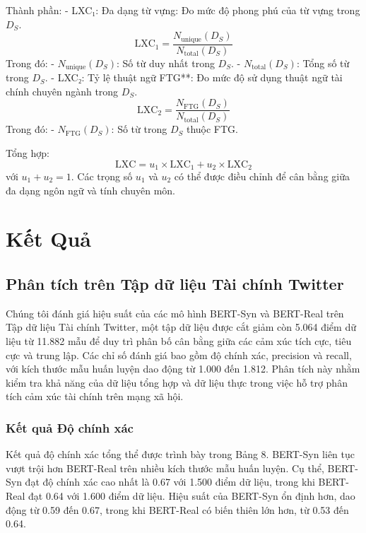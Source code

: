 \documentclass[a4paper,10pt]{article}
\begin{document}
Thành phần:
- LXC₁: Đa dạng từ vựng: Đo mức độ phong phú của từ vựng trong \( D_S \).
  \[
  \text{LXC}_1 = \frac{N_{\text{unique}}(D_S)}{N_{\text{total}}(D_S)}
  \]
  Trong đó:
  - \( N_{\text{unique}}(D_S) \): Số từ duy nhất trong \( D_S \).
  - \( N_{\text{total}}(D_S) \): Tổng số từ trong \( D_S \).
- LXC₂: Tỷ lệ thuật ngữ FTG**: Đo mức độ sử dụng thuật ngữ tài chính chuyên ngành trong \( D_S \).
  \[
  \text{LXC}_2 = \frac{N_{\text{FTG}}(D_S)}{N_{\text{total}}(D_S)}
  \]
  Trong đó:
  - \( N_{\text{FTG}}(D_S) \): Số từ trong \( D_S \) thuộc FTG.

Tổng hợp:
\[
\text{LXC} = u_1 \times \text{LXC}_1 + u_2 \times \text{LXC}_2
\]
với \( u_1 + u_2 = 1 \). Các trọng số \( u_1 \) và \( u_2 \) có thể được điều chỉnh để cân bằng giữa đa dạng ngôn ngữ và tính chuyên môn.

\section{Kết Quả}
\subsection{Phân tích trên Tập dữ liệu Tài chính Twitter} 

\indent  Chúng tôi đánh giá hiệu suất của các mô hình BERT-Syn và BERT-Real trên Tập dữ liệu Tài chính Twitter, một tập dữ liệu được cắt giảm còn 5.064 điểm dữ liệu từ 11.882 mẫu để duy trì phân bố cân bằng giữa các cảm xúc tích cực, tiêu cực và trung lập. Các chỉ số đánh giá bao gồm độ chính xác, precision và recall, với kích thước mẫu huấn luyện dao động từ 1.000 đến 1.812. Phân tích này nhằm kiểm tra khả năng của dữ liệu tổng hợp và dữ liệu thực trong việc hỗ trợ phân tích cảm xúc tài chính trên mạng xã hội.

\subsubsection{Kết quả Độ chính xác} 

Kết quả độ chính xác tổng thể được trình bày trong Bảng 8. BERT-Syn liên tục vượt trội hơn BERT-Real trên nhiều kích thước mẫu huấn luyện. Cụ thể, BERT-Syn đạt độ chính xác cao nhất là 0.67 với 1.500 điểm dữ liệu, trong khi BERT-Real đạt 0.64 với 1.600 điểm dữ liệu. Hiệu suất của BERT-Syn ổn định hơn, dao động từ 0.59 đến 0.67, trong khi BERT-Real có biến thiên lớn hơn, từ 0.53 đến 0.64.
\end{document}
